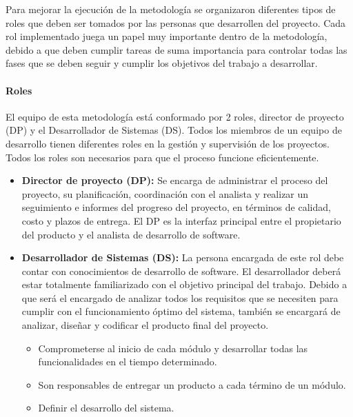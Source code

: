 Para mejorar la ejecución de la metodología se organizaron diferentes tipos de roles que deben ser tomados por las personas que desarrollen del proyecto. Cada rol implementado juega un papel muy importante dentro de la metodología, debido a que deben cumplir tareas de suma importancia para controlar todas las fases que se deben seguir y cumplir los objetivos del trabajo a desarrollar.

\paragraph{Roles}

El equipo de esta metodología está conformado por 2 roles, director de proyecto (DP) y el Desarrollador de Sistemas (DS). Todos los miembros de un equipo de desarrollo tienen diferentes roles en la gestión y supervisión de los proyectos. Todos los roles son necesarios para que el proceso funcione eficientemente.

\begin{itemize}
	\item \textbf{Director de proyecto (DP):} Se encarga de administrar el proceso del proyecto, su planificación, coordinación con el analista y realizar un seguimiento e informes del progreso del proyecto, en términos de calidad, costo y plazos de entrega. El DP es la interfaz principal entre el propietario del producto y el analista de desarrollo de software.
	
	\item \textbf{Desarrollador de Sistemas (DS):} La persona encargada de este rol debe contar con conocimientos de desarrollo de software. El desarrollador deberá estar totalmente familiarizado con el objetivo principal del trabajo. Debido a que será el encargado de analizar todos los requisitos que se necesiten para cumplir con el funcionamiento óptimo del sistema, también se encargará de analizar, diseñar y codificar el producto final del proyecto.
	
	\begin{itemize}
		\item Comprometerse al inicio de cada módulo y desarrollar todas las funcionalidades en el tiempo determinado.
		
		\item Son responsables de entregar un producto a cada término de un módulo.
		
		\item Definir el desarrollo del sistema.
	\end{itemize} 
\end{itemize}

